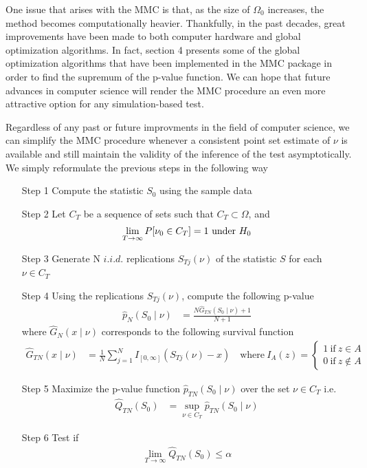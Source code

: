 \documentclass[]{article}\usepackage[]{graphicx}\usepackage[]{color}
\newcommand{\pkg}[1]{{\normalfont\fontseries{b}\selectfont #1}}
\begin{document}
One issue that arises with the MMC is that, as the size of $\Omega_0$ increases, the method becomes computationally heavier. Thankfully, in the past decades, great improvements have been made to both computer hardware and global optimization algorithms. In fact, section 4 presents some of the global optimization algorithms that have been implemented in the \pkg{MMC} package in order to find the supremum of the p-value function. We can hope that future advances in computer science will render the MMC procedure an even more attractive option for any simulation-based test.

Regardless of any past or future improvments in the field of computer science, we can simplify the MMC procedure whenever a consistent point set estimate of $\nu$ is available and still maintain the validity of the inference of the test asymptotically. We simply reformulate the previous steps in the following way
\begin{itemize}
	\item[Step 1] Compute the statistic $S_0$ using the sample data
	\item[Step 2] Let $C_T$ be a sequence of sets such that $C_T \subset \Omega$, and
	\begin{align}
	\label{eq:consistent}
	\lim\limits_{T \rightarrow \infty}P[\nu_0 \in C_T] = 1 \textnormal{ under } H_0
	\end{align}
	\item[Step 3] Generate N $i.i.d.$ replications $S_{Tj}(\nu)$ of the statistic $S$ for each $\nu \in C_T$
	\item[Step 4] Using the replications $S_{Tj}(\nu)$, compute the following p-value
	\begin{align}
	\hat{p}_{N}(S_{0} \mid \nu) & = \frac{N\hat{G}_{TN}(S_{0} \mid \nu)+1}{N+1}
	\end{align}
	where $\hat{G}_{N}(x \mid \nu)$ corresponds to the following survival function
	\begin{align}
	\hat{G}_{TN}(x \mid \nu) & =\frac{1}{N}\sum_{j=1}^{N}I_{[0,\infty]}(S_{Tj}(\nu)-x) \quad \mathrm{where} \ I_{A}(z)=\left\{\begin{array}{l}
	1\ \mathrm{if}\ z\in A\\
	0\ \mathrm{if}\ z\not\in A
	\end{array}\right.
	\end{align}

	\item[Step 5] Maximize the p-value function $\hat{p}_{TN}(S_{0} \mid \nu)$ over the set $\nu \in C_T$ i.e.
	\begin{align}
	\hat{Q}_{TN}(S_0) & = \sup_{\nu \in C_T} \hat{p}_{TN}(S_{0} \mid \nu)
	\end{align}

	\item[Step 6] Test if
	\begin{align}
	\lim\limits_{T \rightarrow \infty}\hat{Q}_{TN}(S_{0})\leq \alpha
	\end{align}
\end{itemize}
\end{document}

